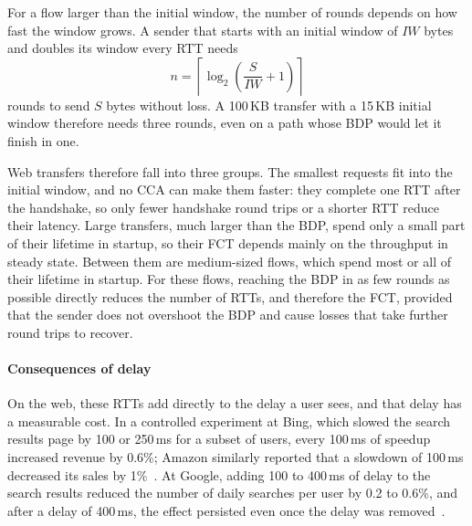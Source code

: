 For a flow larger than the initial window, the number of rounds depends on how fast
the window grows. A sender that starts with an initial window of $\mathit{IW}$ bytes
and doubles its window every RTT needs
\begin{equation}
  n = \left\lceil \log_2\!\left(\frac{S}{\mathit{IW}} + 1\right) \right\rceil
  \label{eq:bg-ss-rounds}
\end{equation}
rounds to send $S$ bytes without loss. A 100\,KB transfer with a 15\,KB initial
window therefore needs three rounds, even on a path whose BDP would let it finish in
one.

Web transfers therefore fall into three groups. The smallest requests fit into the
initial window, and no CCA can make them faster: they complete one RTT after the
handshake, so only fewer handshake round trips or a shorter RTT reduce their latency.
Large transfers, much larger than the BDP, spend only a small part of their lifetime
in startup, so their FCT depends mainly on the throughput in steady state. Between
them are medium-sized flows, which spend most or all of their lifetime in startup. For these flows, reaching
the BDP in as few rounds as possible directly reduces the number of RTTs, and
therefore the FCT, provided that the sender does not overshoot the BDP and cause
losses that take further round trips to recover.


\paragraph{Consequences of delay} On the web, these RTTs
add directly to the delay a user sees, and that delay has a measurable cost. In a
controlled experiment at Bing, which slowed the search results page by 100 or
250\,ms for a subset of users, every 100\,ms of speedup increased revenue by
0.6\%; Amazon similarly reported that a slowdown of 100\,ms decreased its sales by
1\%~\cite{kohavi2014seven}. At Google, adding 100 to 400\,ms of delay to the search
results reduced the number of daily searches per user by 0.2 to 0.6\%, and after a
delay of 400\,ms, the effect persisted even once the delay was
removed~\cite{brutlag2009speed}.
